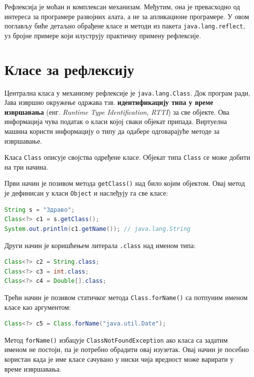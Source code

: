 Рефлексија је моћан и комплексан механизам. Међутим, она је превасходно од интереса за програмере развојних алата, а не за апликационе програмере. У овом поглављу биће детаљно обрађене класе и методи из пакета \texttt{java.lang.reflect}, уз бројне примере који илуструју практичну примену рефлексије.

\section{Класе за рефлексију}

Централна класа у механизму рефлексије је \texttt{java.lang.Class}. Док програм ради, Јава извршно окружење одржава тзв. \textbf{идентификацију типа у време извршавања} (енг. \textit{Runtime Type Identification, RTTI}) за све објекте. Ова информација чува податак о класи којој сваки објекат припада. Виртуелна машина користи информацију о типу да одабере одговарајуће методе за извршавање.

Класа \texttt{Class} описује својства одређене класе. Објекат типа \texttt{Class} се може добити на три начина.

Први начин је позивом метода \texttt{getClass()} над било којим објектом.  Овај метод је дефинисан у класи \texttt{Object} и наслеђују га све класе:

\begin{lstlisting}[language=Java]
String s = "Здраво";
Class<?> c1 = s.getClass();
System.out.println(c1.getName()); // java.lang.String
\end{lstlisting}


Други начин је коришћењем литерала \texttt{.class} над именом типа:

\begin{lstlisting}[language=Java]
Class<?> c2 = String.class;
Class<?> c3 = int.class;
Class<?> c4 = Double[].class;
\end{lstlisting}


Трећи начин је позивом статичког метода \texttt{Class.forName()} са потпуним именом класе као аргументом:

\begin{lstlisting}[language=Java]
Class<?> c5 = Class.forName("java.util.Date");
\end{lstlisting}


Метод \texttt{forName()} избацује \texttt{ClassNotFoundException} ако класа са задатим именом не постоји, па је потребно обрадити овај изузетак. Овај начин је посебно користан када је име класе сачувано у ниски чија вредност може варирати у време извршавања.

